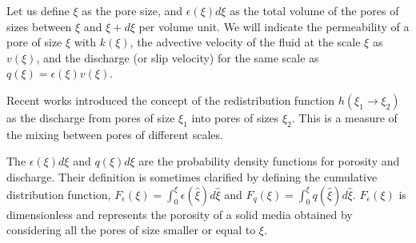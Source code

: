 \documentclass{CFD2011}
\newcommand{\Fede}[1]{\textcolor{green}{Fede: #1} \\}
\newcommand{\newf}[1]{#1}
\newcommand{\nof}[1]{\textcolor{cyan}{}}
\begin{document}

\nof{Let's}\newf{Let us} define $\xi$ as the pore size, and $\epsilon(\xi)d\xi$ \newf{as the total volume of the pores} \nof{the summed volume for all the pores }of sizes between $\xi$ and $\xi+d\xi$ per volume unit.
\nof{On average, the permeability will be different for each pore size as well, $k(\xi)$. A driven force will produce an advective velocity of the fluid at the scale $\xi$ denoted as $v(\xi)$, and the discharge (or slip velocity) for the same scale is $q(\xi)=\epsilon(\xi) v(\xi)$.}
\newf{We will indicate the permeability of a pore of size $\xi$ with $k(\xi)$, the advective velocity of the fluid at the scale $\xi$ as $v(\xi)$, and the discharge (or slip velocity) for the same scale as $q(\xi)=\epsilon(\xi) v(\xi)$}.



Recent works \cite{DupuySchwarz} introduced the concept of the redistribution function $h(\xi_1 \rightarrow \xi_2)$ as the discharge from pores of size $\xi_1$ into pores of sizes $\xi_2$. This is a measure of the mixing between pores of different scales.

The $\epsilon(\xi)d\xi$ and $q(\xi)d\xi$ are the probability density functions for porosity and discharge. Their definition is sometimes clarified by defining the cumulative distribution function, $F_{\epsilon}(\xi)=\int_0^{\xi}\epsilon(\hat \xi)d\hat\xi$ and $F_{q}(\xi)=\int_0^{\xi}q(\hat\xi)d\hat\xi$. $F_{\epsilon}(\xi)$ is dimensionless and represents the porosity of a solid media obtained by considering all the pores of size smaller or equal to $\xi$.
\end{document}
